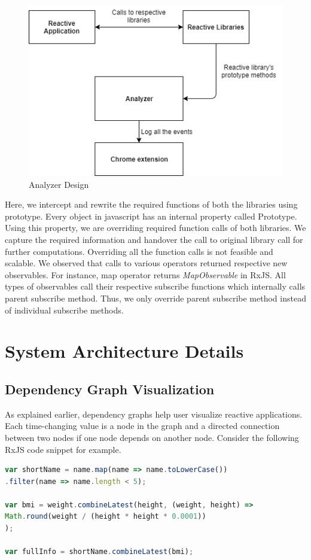 \begin{figure}[!h]
	\centering
	\includegraphics[scale=0.6,trim=0 0 0 0]{images/analyzer-design.png}
	\caption{Analyzer Design}
	\label{fig:analyzer-design}
\end{figure}

Here, we intercept and rewrite the required functions of both the libraries using prototype\cite{prototype}. Every object in javascript has an internal property called Prototype. Using this property, we are overriding required function calls of both libraries. We capture the required information and handover the call to original library call for further computations. Overriding all the function calls is not feasible and scalable. We observed that calls to various operators returned respective new observables. For instance, map operator returns \textit{MapObservable} in RxJS. All types of observables call their respective subscribe functions which internally calls parent subscribe method. Thus, we only override parent subscribe method instead of individual subscribe methods. 

\section{System Architecture Details}
\subsection{Dependency Graph Visualization}
As explained earlier, dependency graphs help user visualize reactive applications. Each time-changing value is a node in the graph and a directed connection between two nodes if one node depends on another node. Consider the following RxJS code snippet for example. 
\begin{lstlisting}[language=JavaScript, caption=RxJS code example, label={lst:rxjs-code-example}]
var shortName = name.map(name => name.toLowerCase())
.filter(name => name.length < 5);

var bmi = weight.combineLatest(height, (weight, height) =>
Math.round(weight / (height * height * 0.0001))
);

var fullInfo = shortName.combineLatest(bmi);
\end{lstlisting}

